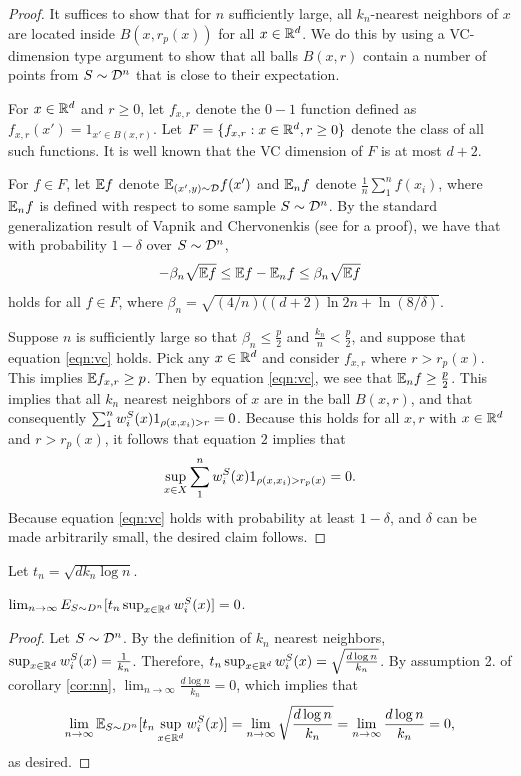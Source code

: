 \begin{proof}
It suffices to show that for $n$ sufficiently large, all $k_n$-nearest neighbors of $x$ are located inside $B(x, r_p(x))$ for all $x \in \mathbb R^d$. We do this by using a VC-dimension type argument to show that all balls $B(x, r)$ contain a number of points from $S \sim {\mathcal D}^n$ that is close to their expectation. 

For $x \in \mathbb R^d$ and $r \geq 0$, let $f_{x, r}$ denote the $0-1$ function defined as $f_{x,r}(x') = 1_{x' \in B(x,r)}$. Let $F = \{f_{x, r}: x \in \mathbb R^d, r \geq 0\}$ denote the class of all such functions. It is well known that the VC dimension of $F$ is at most $d+2$. 

For $f \in F$, let $\mathbb{E} f$ denote $\mathbb{E}_{(x', y) \sim {\mathcal D}}f(x')$ and $\mathbb{E}_nf$ denote $\frac{1}{n}\sum_1^n f(x_i)$, where $\mathbb{E}_nf$ is defined with respect to some sample $S \sim {\mathcal D}^n$. By the standard generalization result of Vapnik and Chervonenkis (see \cite{Dasgupta07} for a proof), we have that with probability $1- \delta$ over $S \sim {\mathcal D}^n$, \begin{equation}\label{eqn:vc}-\beta_n\sqrt{\mathbb{E} f} \leq \mathbb{E} f - \mathbb{E}_nf \leq \beta_n\sqrt{\mathbb{E} f}\end{equation} holds for all $f \in F$, where $\beta_n = \sqrt{(4/n)((d+2)\ln 2n + \ln(8/\delta)}.$ 

Suppose $n$ is sufficiently large so that $\beta_n \leq \frac{p}{2}$ and $\frac{k_n}{n} < \frac{p}{2}$, and suppose that equation \ref{eqn:vc} holds. Pick any $x \in \mathbb R^d$ and consider $f_{x, r}$ where $r > r_p(x)$. This implies $\mathbb{E} f_{x, r} \geq p$. Then by equation \ref{eqn:vc}, we see that $\mathbb{E}_nf \geq \frac{p}{2}$. This implies that all $k_n$ nearest neighbors of $x$ are in the ball $B(x,r)$, and that consequently $\sum_1^n w_i^S(x)1_{\rho(x, x_i) > r} = 0$. Because this holds for all $x, r$ with $x \in \mathbb R^d$ and $r > r_p(x)$, it follows that equation $2$ implies that $$\sup_{x \in X} \sum_1^n w_i^S(x) 1_{\rho(x, x_i) > r_p(x)} = 0.$$ Because equation \ref{eqn:vc} holds with probability at least $1 - \delta$, and $\delta$ can be made arbitrarily small, the desired claim follows. 
\end{proof}

Let $t_n = \sqrt{d k_n\log n}$.

\begin{lem}
 $\lim_{n \to \infty} E_{S \sim D^n}[t_n \sup_{x \in \mathbb R^d} w_i^S(x)] = 0$.
\end{lem}

\begin{proof}
Let $S \sim {\mathcal D}^n$. By the definition of $k_n$ nearest neighbors, $\sup_{x \in \mathbb R^d}w_i^S(x) = \frac{1}{k_n}$. Therefore, $t_n\sup_{x \in \mathbb R^d} w_i^S(x) = \sqrt{\frac{d\log n}{k_n}}$. By assumption 2. of corollary \ref{cor:nn}, $\lim_{n \to \infty} \frac{d \log n}{k_n} = 0$, which implies that $$\lim_{n \to \infty} \mathbb{E}_{S \sim D^n}[t_n\sup_{x \in \mathbb R^d} w_i^S(x)] = \lim_{n \to \infty} \sqrt{\frac{d\log n}{k_n}} = \lim_{n \to \infty} \frac{d \log n}{k_n} = 0,$$ as desired.
\end{proof}

